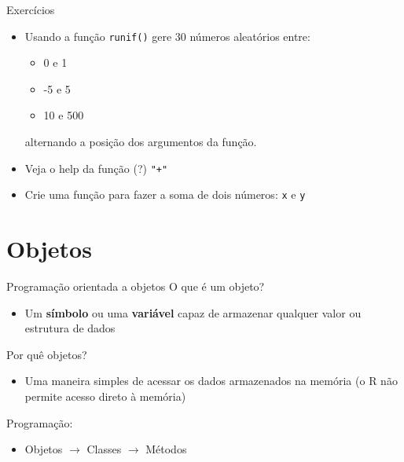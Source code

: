 \documentclass[10pt,handout]{beamer}\usepackage[]{graphicx}\usepackage[]{color}
\begin{document}
\begin{frame}[fragile]{Exercícios}
  \begin{itemize}
  \item Usando a função \verb|runif()| gere $30$ números
    aleatórios entre:
    \begin{itemize}
    \item 0 e 1
    \item -5 e 5
    \item 10 e 500
    \end{itemize}
    alternando a posição dos argumentos da função.
  \item Veja o help da função (?) \verb|"+"|
  \item Crie uma função para fazer a soma de dois números: \texttt{x} e
    \texttt{y}
  \end{itemize}


\end{frame}

\section{Objetos}

\begin{frame}[fragile]{Programação orientada a objetos}
O que é um objeto?
\begin{itemize}
\item Um \textbf{símbolo} ou uma \textbf{variável} capaz de armazenar
  qualquer valor ou estrutura de dados
\end{itemize}
Por quê objetos?
\begin{itemize}
\item Uma maneira simples de acessar os dados armazenados na memória (o
  R não permite acesso direto à memória)
\end{itemize}
Programação:
\begin{itemize}
\item Objetos $\rightarrow$ Classes $\rightarrow$ Métodos
\end{itemize}
\end{frame}
\end{document}
